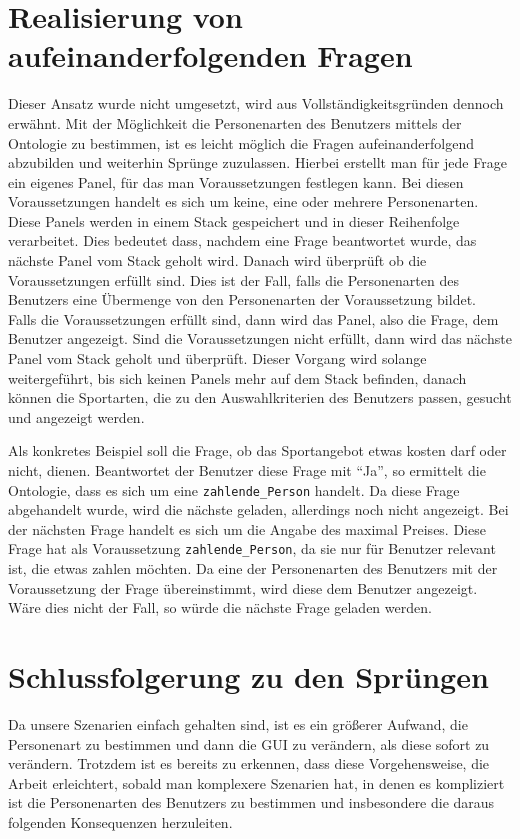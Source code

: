 \section{Realisierung von aufeinanderfolgenden Fragen}
Dieser Ansatz wurde nicht umgesetzt, wird aus Vollständigkeitsgründen dennoch erwähnt. Mit der Möglichkeit die Personenarten des Benutzers mittels der Ontologie zu bestimmen, ist es leicht möglich die Fragen aufeinanderfolgend abzubilden und weiterhin Sprünge zuzulassen. Hierbei erstellt man für jede Frage ein eigenes Panel, für das man Voraussetzungen festlegen kann. Bei diesen Voraussetzungen handelt es sich um keine, eine oder mehrere Personenarten. Diese Panels werden in einem Stack gespeichert und in dieser Reihenfolge verarbeitet. Dies bedeutet dass, nachdem eine Frage beantwortet wurde, das nächste Panel vom Stack geholt wird. Danach wird überprüft ob die Voraussetzungen erfüllt sind. Dies ist der Fall, falls die Personenarten des Benutzers eine Übermenge von den Personenarten der Voraussetzung bildet. \\
Falls die Voraussetzungen erfüllt sind, dann wird das Panel, also die Frage, dem Benutzer angezeigt. Sind die Voraussetzungen nicht erfüllt, dann wird das nächste Panel vom Stack geholt und überprüft. Dieser Vorgang wird solange weitergeführt, bis sich keinen Panels mehr auf dem Stack befinden, danach können die Sportarten, die zu den Auswahlkriterien des Benutzers passen, gesucht und angezeigt werden.

Als konkretes Beispiel soll die Frage, ob das Sportangebot etwas kosten darf oder nicht, dienen. Beantwortet der Benutzer diese Frage mit "`Ja"', so ermittelt die Ontologie, dass es sich um eine \lstinline"zahlende_Person" handelt. Da diese Frage abgehandelt wurde, wird die nächste geladen, allerdings noch nicht angezeigt. Bei der nächsten Frage handelt es sich um die Angabe des maximal Preises. Diese Frage hat als Voraussetzung \lstinline"zahlende_Person", da sie nur für Benutzer relevant ist, die etwas zahlen möchten. Da eine der Personenarten des Benutzers mit der Voraussetzung der Frage übereinstimmt, wird diese dem Benutzer angezeigt. Wäre dies nicht der Fall, so würde die nächste Frage geladen werden.

\section{Schlussfolgerung zu den Sprüngen}
Da unsere Szenarien einfach gehalten sind, ist es ein größerer Aufwand, die Personenart zu bestimmen und dann die GUI zu verändern, als diese sofort zu verändern. Trotzdem ist es bereits zu erkennen, dass diese Vorgehensweise, die Arbeit erleichtert, sobald man komplexere Szenarien hat, in denen es kompliziert ist die Personenarten des Benutzers zu bestimmen und insbesondere die daraus folgenden Konsequenzen herzuleiten.